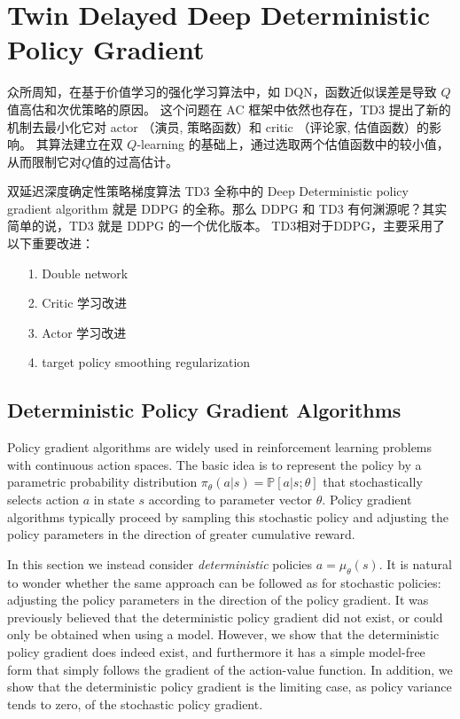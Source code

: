 ﻿
\chapter{Twin Delayed Deep Deterministic Policy Gradient}

众所周知，在基于价值学习的强化学习算法中，如 DQN，函数近似误差是导致 $Q$ 值高估和次优策略的原因。
这个问题在 AC 框架中依然也存在，TD3 
提出了新的机制去最小化它对 actor （演员, 策略函数）和 critic （评论家, 估值函数）的影响。
其算法建立在双 $Q$-learning 的基础上，通过选取两个估值函数中的较小值，从而限制它对$Q$值的过高估计。

双延迟深度确定性策略梯度算法 TD3 全称中的 
Deep Deterministic policy gradient algorithm 就是 DDPG 的全称。那么 
DDPG 和 TD3 有何渊源呢？其实简单的说，TD3 就是 DDPG 的一个优化版本。
TD3相对于DDPG，主要采用了以下重要改进：
\begin{itemize}
\setlength{\parskip}{0pt}
\item[1.]
Double network
\item[2.]
Critic 学习改进
\item[3.]
Actor 学习改进
\item[4.]
target policy smoothing regularization
\end{itemize}


\section{Deterministic Policy Gradient Algorithms}

Policy gradient algorithms are widely used in reinforcement learning problems 
with continuous action spaces. The basic idea is to represent the policy by 
a parametric probability distribution $\pi_\theta(a|s) = \mathbb{P}
[a|s; \theta]$ that stochastically selects action $a$ in state $s$ according 
to parameter vector $\theta$. Policy gradient algorithms typically proceed 
by sampling this stochastic policy and adjusting the policy parameters
in the direction of greater cumulative reward.

In this section we instead consider \emph{deterministic} policies 
$a = \mu_\theta(s)$. It is natural to wonder whether the same approach can 
be followed as for stochastic policies: adjusting the policy parameters in 
the direction of the policy gradient. It was previously believed that the 
deterministic policy gradient did not exist, or could only be obtained when
using a model. However, we show that the deterministic policy gradient does 
indeed exist, and furthermore it has a simple model-free form that simply 
follows the gradient of the action-value function. In addition, we 
show that the deterministic policy gradient is the limiting
case, as policy variance tends to zero, of the stochastic policy gradient.

